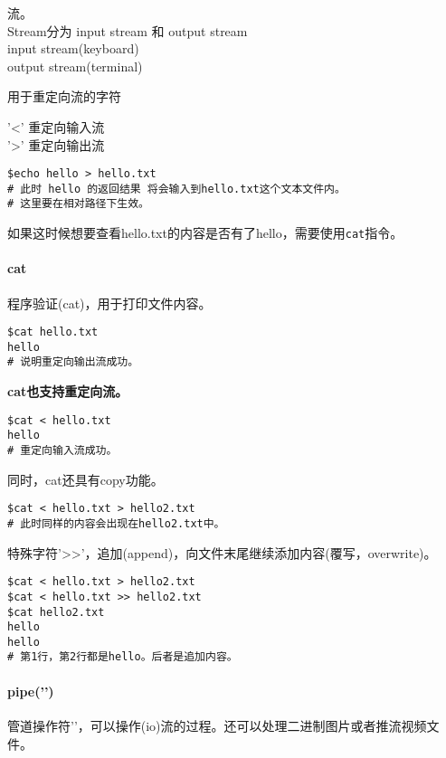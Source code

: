\documentclass[
]{article}
\begin{document}
流。\\
Stream分为 input stream 和 output stream\\
input stream(keyboard)\\
output stream(terminal)

用于重定向流的字符

'\textless' 重定向输入流\\
'\textgreater' 重定向输出流

\begin{verbatim}
$echo hello > hello.txt
# 此时 hello 的返回结果 将会输入到hello.txt这个文本文件内。
# 这里要在相对路径下生效。
\end{verbatim}

如果这时候想要查看hello.txt的内容是否有了hello，需要使用\texttt{cat}指令。

\hypertarget{cat}{%
\paragraph{cat}\label{cat}}

程序验证(cat)，用于打印文件内容。

\begin{verbatim}
$cat hello.txt
hello
# 说明重定向输出流成功。
\end{verbatim}

\textbf{cat也支持重定向流。}

\begin{verbatim}
$cat < hello.txt
hello
# 重定向输入流成功。
\end{verbatim}

同时，cat还具有copy功能。

\begin{verbatim}
$cat < hello.txt > hello2.txt
# 此时同样的内容会出现在hello2.txt中。
\end{verbatim}

特殊字符'\textgreater\textgreater'，追加(append)，向文件末尾继续添加内容(覆写，overwrite)。

\begin{verbatim}
$cat < hello.txt > hello2.txt
$cat < hello.txt >> hello2.txt
$cat hello2.txt
hello
hello
# 第1行，第2行都是hello。后者是追加内容。
\end{verbatim}

\hypertarget{pipe}{%
\paragraph{pipe('\textbar')}\label{pipe}}

管道操作符'\textbar'，可以操作(io)流的过程。还可以处理二进制图片或者推流视频文件。
\end{document}
